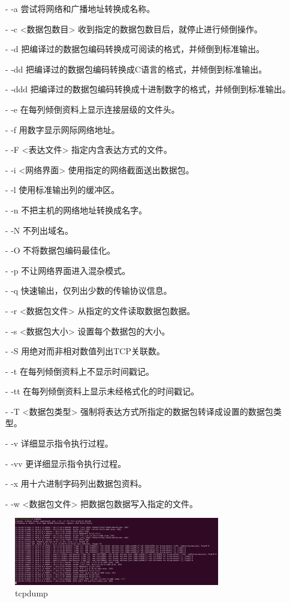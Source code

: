 \begin{itemize}
\item [-] -a 尝试将网络和广播地址转换成名称。
\item [-] -c <数据包数目> 收到指定的数据包数目后，就停止进行倾倒操作。
\item [-] -d 把编译过的数据包编码转换成可阅读的格式，并倾倒到标准输出。
\item [-] -dd 把编译过的数据包编码转换成C语言的格式，并倾倒到标准输出。
\item [-] -ddd 把编译过的数据包编码转换成十进制数字的格式，并倾倒到标准输出。
\item [-] -e 在每列倾倒资料上显示连接层级的文件头。
\item [-] -f 用数字显示网际网络地址。
\item [-] -F <表达文件> 指定内含表达方式的文件。
\item [-] -i <网络界面> 使用指定的网络截面送出数据包。
\item [-] -l 使用标准输出列的缓冲区。
\item [-] -n 不把主机的网络地址转换成名字。
\item [-] -N 不列出域名。
\item [-] -O 不将数据包编码最佳化。
\item [-] -p 不让网络界面进入混杂模式。
\item [-] -q 快速输出，仅列出少数的传输协议信息。
\item [-] -r <数据包文件> 从指定的文件读取数据包数据。
\item [-] -s <数据包大小> 设置每个数据包的大小。
\item [-] -S 用绝对而非相对数值列出TCP关联数。
\item [-] -t 在每列倾倒资料上不显示时间戳记。
\item [-] -tt 在每列倾倒资料上显示未经格式化的时间戳记。
\item [-] -T <数据包类型> 强制将表达方式所指定的数据包转译成设置的数据包类型。
\item [-] -v 详细显示指令执行过程。
\item [-] -vv 更详细显示指令执行过程。
\item [-] -x 用十六进制字码列出数据包资料。
\item [-] -w <数据包文件> 把数据包数据写入指定的文件。
\end{itemize}

\begin{figure}[htb]
\centering 
\includegraphics[width=0.80\textwidth]{img/newch1m1.png} 
\caption{tcpdump}
\label{Test}
\end{figure}

